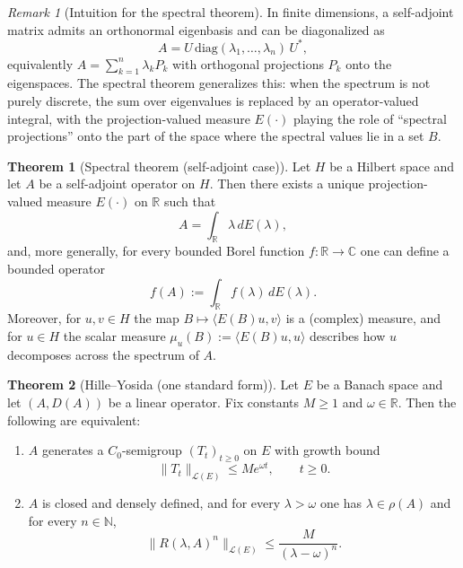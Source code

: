 \documentclass[11pt]{article}
\theoremstyle{definition}
\newtheorem{theorem}{Theorem}
\theoremstyle{remark}
\newtheorem{remark}{Remark}
\begin{document}
\begin{remark}[Intuition for the spectral theorem]
In finite dimensions, a self-adjoint matrix admits an orthonormal eigenbasis and can be diagonalized as
\[
    A = U\,\mathrm{diag}(\lambda_1,\dots,\lambda_n)\,U^*,
\]
equivalently $A=\sum_{k=1}^n \lambda_k P_k$ with orthogonal projections $P_k$ onto the eigenspaces.
The spectral theorem generalizes this: when the spectrum is not purely discrete, the sum over eigenvalues is replaced by an operator-valued integral, with the projection-valued measure $E(\cdot)$ playing the role of ``spectral projections'' onto the part of the space where the spectral values lie in a set $B$.
\end{remark}

\begin{theorem}[Spectral theorem (self-adjoint case)]
Let $H$ be a Hilbert space and let $A$ be a self-adjoint operator on $H$.
Then there exists a unique projection-valued measure $E(\cdot)$ on $\mathbb{R}$ such that
\[
    A = \int_{\mathbb{R}} \lambda\,dE(\lambda),
\]
and, more generally, for every bounded Borel function $f:\mathbb{R}\to\mathbb{C}$ one can define a bounded operator
\[
    f(A) := \int_{\mathbb{R}} f(\lambda)\,dE(\lambda).
\]
Moreover, for $u,v\in H$ the map $B\mapsto \langle E(B)u,v\rangle$ is a (complex) measure, and for $u\in H$ the scalar measure $\mu_u(B):=\langle E(B)u,u\rangle$ describes how $u$ decomposes across the spectrum of $A$.
\end{theorem}

\begin{theorem}[Hille--Yosida (one standard form)]
Let $E$ be a Banach space and let $(A,D(A))$ be a linear operator.
Fix constants $M\ge 1$ and $\omega\in\mathbb{R}$.
Then the following are equivalent:
\begin{enumerate}
    \item $A$ generates a $C_0$-semigroup $(T_t)_{t\ge 0}$ on $E$ with growth bound
    \[
        \|T_t\|_{\mathcal{L}(E)} \le M e^{\omega t}, \qquad t\ge 0.
    \]
		    \item $A$ is closed and densely defined, and for every $\lambda>\omega$ one has $\lambda\in\rho(A)$ and for every $n\in\mathbb{N}$,
		    \[
		        \|R(\lambda,A)^n\|_{\mathcal{L}(E)}
		        \le
	        \frac{M}{(\lambda-\omega)^n}.
	    \]
	\end{enumerate}
\end{theorem}
\end{document}
